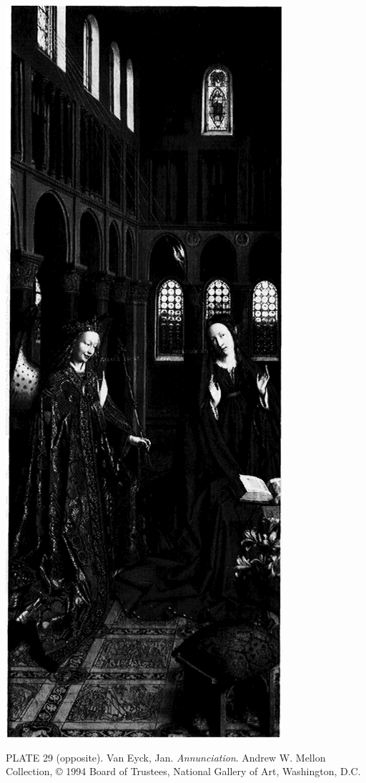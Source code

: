 \protect\hypertarget{20_ILLUSTRATIONS_FOLLOW_PAGE.xhtmlux5cux23id_26}{}{}\includegraphics{include/html/images/346_1.png}

PLATE 29 (opposite). Van Eyck, Jan. \emph{Annunciation}. Andrew W.
Mellon Collection, © 1994 Board of Trustees, National Gallery of Art,
Washington, D.C.


